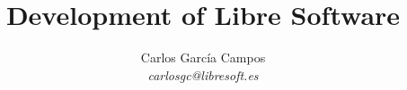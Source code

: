 \documentclass{beamer}
\title{Development of Libre Software}
\subtitle{}
\author{Carlos García Campos \\{\it carlosgc@libresoft.es}}
\institute{}
\date{}
\begin{document}
\begin{frame}
\titlepage
\end{frame}





\end{document}

